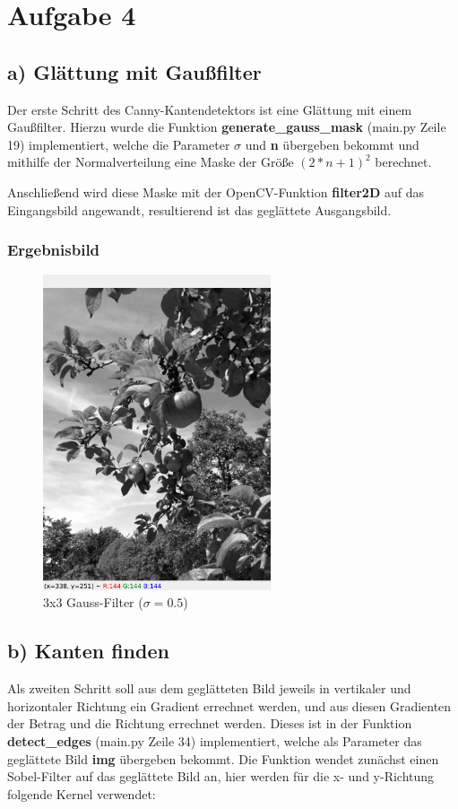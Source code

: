 \documentclass[12pt]{article}
\begin{document}

\section*{Aufgabe 4}
\subsection*{a) Glättung mit Gaußfilter}
Der erste Schritt des Canny-Kantendetektors ist eine Glättung mit einem Gaußfilter.
Hierzu wurde die Funktion \textbf{generate\_gauss\_mask} (main.py Zeile 19) implementiert, welche die Parameter $\sigma$ und \textbf{n} übergeben bekommt und mithilfe der Normalverteilung eine Maske der Größe $(2 * n + 1)^2$ berechnet.

Anschließend wird diese Maske mit der OpenCV-Funktion \textbf{filter2D} auf das Eingangsbild angewandt, resultierend ist das geglättete Ausgangsbild.

\subsubsection*{Ergebnisbild}
\begin{figure}[H]
  \centering
  \includegraphics[width=0.6\textwidth, keepaspectratio]{gauss.png}\\
  3x3 Gauss-Filter ($\sigma = 0.5$)
\end{figure}

\newpage

\subsection*{b) Kanten finden}
Als zweiten Schritt soll aus dem geglätteten Bild jeweils in vertikaler und horizontaler Richtung ein Gradient errechnet werden, und aus diesen Gradienten der Betrag und die Richtung errechnet werden.
Dieses ist in der Funktion \textbf{detect\_edges} (main.py Zeile 34) implementiert, welche als Parameter das geglättete Bild \textbf{img} übergeben bekommt.
Die Funktion wendet zunächst einen Sobel-Filter auf das geglättete Bild an, hier werden für die x- und y-Richtung folgende Kernel verwendet:
\end{document}
